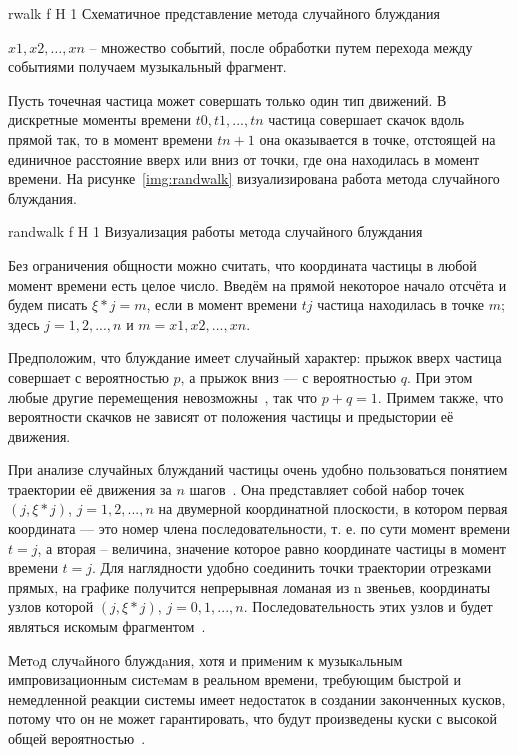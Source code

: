 {rwalk}
{f}
{H}
{1\textwidth}
{Схематичное представление метода случайного блуждания}


${x1, x2, …, xn}$ – множество событий, после обработки путем перехода между событиями получаем музыкальный фрагмент.

Пусть точечная частица может совершать только один тип движений. В дискретные моменты времени ${t0, t1, ..., tn} $ частица совершает скачок вдоль прямой так, 
то в момент времени $tn+1 $ она оказывается в точке, отстоящей на единичное расстояние вверх или вниз от точки, где она находилась в момент времени.
На рисунке~\ref{img:randwalk} визуализирована работа метода случайного блуждания.

{randwalk}
{f}
{H}
{1\textwidth}
{Визуализация работы метода случайного блуждания}


Без ограничения общности можно считать, что координата частицы в любой момент времени есть целое число.
Введём на прямой некоторое начало отсчёта и будем писать $\xi  * j = m$, если в момент времени $tj$ частица находилась в точке $m$; здесь $j = 1, 2, ..., n$  и  $m = x1, x2, ..., xn$.

Предположим, что блуждание имеет случайный характер:
прыжок вверх частица совершает с вероятностью $p$, а прыжок вниз — с вероятностью $q$.
При этом любые другие перемещения невозможны~\cite{rwalk}, так что $p + q = 1$.
Примем также, что вероятности скачков не зависят от положения частицы и предыстории её движения.


При анализе случайных блужданий частицы очень удобно пользоваться понятием траектории её движения за $n$ шагов~\cite{rwalk}.
Она представляет собой набор точек $(j, \xi * j)$, $j = 1,2,...,n$ на двумерной координатной плоскости,
в котором первая координата — это номер члена последовательности, т. е. по сути момент времени $t = j$, а вторая -- величина, значение которое равно координате частицы в момент времени $t = j$.
Для наглядности удобно соединить точки траектории отрезками прямых, на графике получится непрерывная ломаная из n звеньев,
координаты узлов которой $(j, \xi * j)$, $j = 0, 1, . . . , n$.
Последовательность этих узлов и будет являться искомым фрагментом~\cite{rwalk}.

Метoд случaйного блуждaния, хотя и примeним к музыкaльным импровизационным систeмам в реальном времени,
требующим быстрой и немедленной реакции системы имеет недостаток в создании законченных кусков, потому что он не может гарантировать,
что будут произведены куски с высокой общей вероятностью~\cite{statistic}. 


